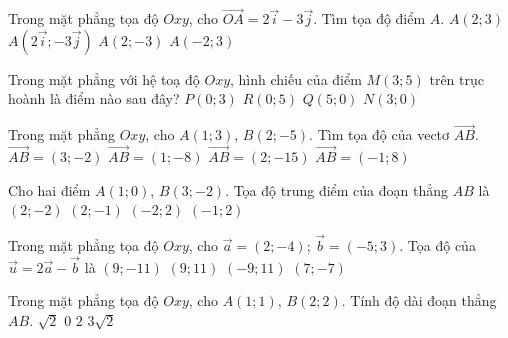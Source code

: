 \begin{ex}%
	Trong mặt phẳng tọa độ $Oxy$, cho $\overrightarrow{OA}=2\overrightarrow{i}-3\overrightarrow{j}$. Tìm tọa độ điểm $A$.
	\choice
	{$A(2;3) $}
	{$A\left(2\overrightarrow{i};-3\overrightarrow{j}\right) $}
	{\True $A(2;-3) $}
	{$A(-2;3) $}
\end{ex}

\begin{ex}%
	Trong mặt phẳng với hệ toạ độ $Oxy$, hình chiếu của điểm $M(3;5)$ trên trục hoành là điểm nào sau đây?
	\choice
	{$P(0;3)$}
	{$R(0;5)$}
	{$Q(5;0)$}
	{\True $N(3;0)$}
\end{ex}

\begin{ex}%
	Trong mặt phẳng $Oxy$, cho $A(1;3)$, $B(2;-5)$. Tìm tọa độ của vectơ $\overrightarrow{AB}$.
	\choice
	{$\overrightarrow{AB}=(3;-2)$}
	{\True $\overrightarrow{AB}=(1;-8)$}
	{$\overrightarrow{AB}=(2;-15)$}
	{$\overrightarrow{AB}=(-1;8)$}
\end{ex}

\begin{ex}%
	Cho hai điểm $A(1;0)$, $B(3;-2)$. Tọa độ trung điểm của đoạn thẳng $AB$ là
	\choice
	{$(2;-2)$}
	{\True $(2;-1)$}
	{$(-2;2)$}
	{$(-1;2)$}
\end{ex}

\begin{ex}%
	Trong mặt phẳng tọa độ $Oxy$, cho $\overrightarrow{a}=(2;-4)$; $\overrightarrow{b}=(-5;3)$. Tọa độ của $\overrightarrow{u}=2\overrightarrow{a}-\overrightarrow{b}$ là  
	\choice
	{\True $(9;-11)$}
	{$(9;11)$}
	{$(-9;11)$}
	{$(7;-7)$}
\end{ex}

\begin{ex}%
	Trong mặt phẳng tọa độ $Oxy$, cho $A(1;1)$, $B(2;2)$. Tính độ dài đoạn thẳng $AB$.
	\choice
	{\True $\sqrt{2}$}
	{$0$}
	{$2$}
	{$3\sqrt{2}$}
\end{ex}

